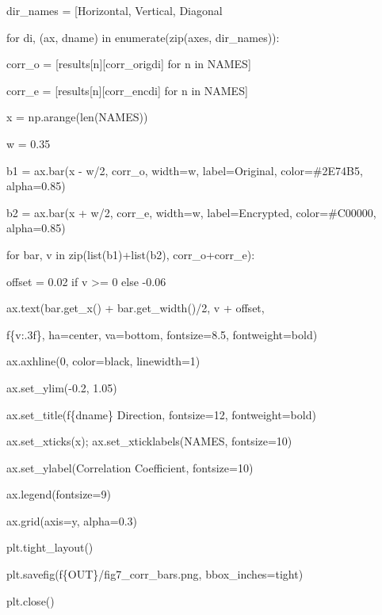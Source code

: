 dir\_names = {[}\textquotesingle Horizontal\textquotesingle, \textquotesingle Vertical\textquotesingle, \textquotesingle Diagonal\textquotesingle{]}

for di, (ax, dname) in enumerate(zip(axes, dir\_names)):

corr\_o = {[}results{[}n{]}{[}\textquotesingle corr\_orig\textquotesingle{]}{[}di{]} for n in NAMES{]}

corr\_e = {[}results{[}n{]}{[}\textquotesingle corr\_enc\textquotesingle{]}{[}di{]} for n in NAMES{]}

x = np.arange(len(NAMES))

w = 0.35

b1 = ax.bar(x - w/2, corr\_o, width=w, label=\textquotesingle Original\textquotesingle, color=\textquotesingle\#2E74B5\textquotesingle, alpha=0.85)

b2 = ax.bar(x + w/2, corr\_e, width=w, label=\textquotesingle Encrypted\textquotesingle, color=\textquotesingle\#C00000\textquotesingle, alpha=0.85)

for bar, v in zip(list(b1)+list(b2), corr\_o+corr\_e):

offset = 0.02 if v \textgreater= 0 else -0.06

ax.text(bar.get\_x() + bar.get\_width()/2, v + offset,

f\textquotesingle\{v:.3f\}\textquotesingle, ha=\textquotesingle center\textquotesingle, va=\textquotesingle bottom\textquotesingle, fontsize=8.5, fontweight=\textquotesingle bold\textquotesingle)

ax.axhline(0, color=\textquotesingle black\textquotesingle, linewidth=1)

ax.set\_ylim(-0.2, 1.05)

ax.set\_title(f\textquotesingle\{dname\} Direction\textquotesingle, fontsize=12, fontweight=\textquotesingle bold\textquotesingle)

ax.set\_xticks(x); ax.set\_xticklabels(NAMES, fontsize=10)

ax.set\_ylabel(\textquotesingle Correlation Coefficient\textquotesingle, fontsize=10)

ax.legend(fontsize=9)

ax.grid(axis=\textquotesingle y\textquotesingle, alpha=0.3)

plt.tight\_layout()

plt.savefig(f\textquotesingle\{OUT\}/fig7\_corr\_bars.png\textquotesingle, bbox\_inches=\textquotesingle tight\textquotesingle)

plt.close()

